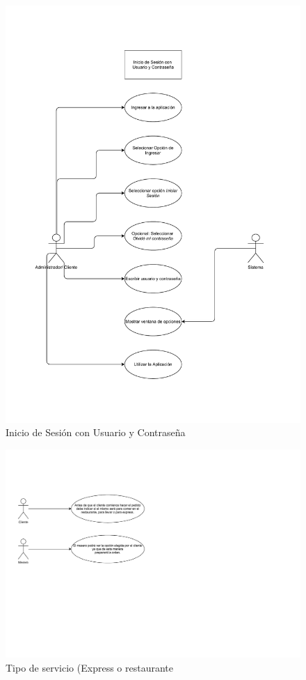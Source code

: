 \documentclass[conference]{IEEEtran}
\begin{document}
\begin{figure}[H]
\centering
\includegraphics[scale=0.24]{imagenes/Requerimiento 7 (1).pdf}
\caption{Inicio de Sesión con Usuario y Contraseña}
\end{figure}

\begin{figure}[H]
\centering
\includegraphics[scale=0.24]{imagenes/Diagrama_requerimiento8.pdf}
\caption{Tipo de servicio (Express o restaurante}
\end{figure}
\end{document}
